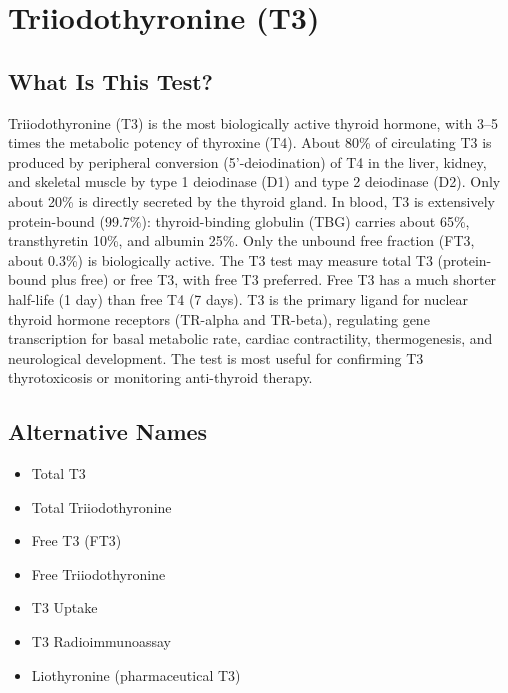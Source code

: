 \chapter{Triiodothyronine (T3)}

\section*{What Is This Test?}
Triiodothyronine (T3) is the most biologically active thyroid hormone, with 3--5 times the metabolic potency of thyroxine (T4). About 80\% of circulating T3 is produced by peripheral conversion (5'-deiodination) of T4 in the liver, kidney, and skeletal muscle by type 1 deiodinase (D1) and type 2 deiodinase (D2). Only about 20\% is directly secreted by the thyroid gland. In blood, T3 is extensively protein-bound (99.7\%): thyroid-binding globulin (TBG) carries about 65\%, transthyretin 10\%, and albumin 25\%. Only the unbound free fraction (FT3, about 0.3\%) is biologically active. The T3 test may measure total T3 (protein-bound plus free) or free T3, with free T3 preferred. Free T3 has a much shorter half-life (1 day) than free T4 (7 days). T3 is the primary ligand for nuclear thyroid hormone receptors (TR-alpha and TR-beta), regulating gene transcription for basal metabolic rate, cardiac contractility, thermogenesis, and neurological development. The test is most useful for confirming T3 thyrotoxicosis or monitoring anti-thyroid therapy.

\section*{Alternative Names}
\begin{itemize}
  \item Total T3
  \item Total Triiodothyronine
  \item Free T3 (FT3)
  \item Free Triiodothyronine
  \item T3 Uptake
  \item T3 Radioimmunoassay
  \item Liothyronine (pharmaceutical T3)
\end{itemize}
